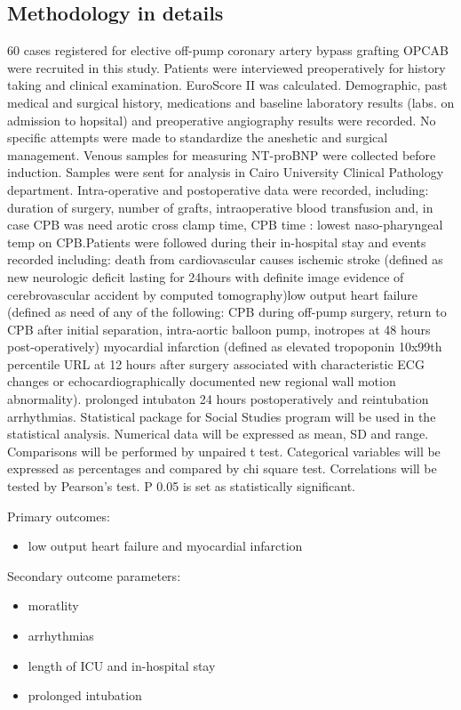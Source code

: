 \documentclass[14pt,a4paper,onecolumn]{article}
\begin{document}
\subsection{Methodology in details}

60 cases registered for elective off-pump coronary artery bypass grafting OPCAB were recruited in this study. Patients were interviewed preoperatively for history taking and clinical examination. EuroScore II was calculated. Demographic, past medical and surgical history, medications and baseline laboratory results (labs. on admission to hopsital) and preoperative angiography results were recorded.  No specific attempts were made to standardize the aneshetic and surgical management.  Venous samples for measuring NT-proBNP were collected before induction. Samples were sent for analysis in Cairo University Clinical Pathology department. Intra-operative and postoperative data were recorded, including: duration of surgery, number of grafts, intraoperative blood transfusion and, in case CPB was need arotic cross clamp time, CPB time : lowest naso-pharyngeal temp on CPB.Patients were followed during their in-hospital stay and events recorded including: death from cardiovascular causes ischemic stroke (defined as new neurologic deficit lasting for  24hours with definite image evidence of cerebrovascular accident by computed tomography)low output heart failure (defined as need of any of the following: CPB during off-pump surgery, return to CPB after initial separation, intra-aortic balloon pump, inotropes at 48 hours post-operatively) myocardial infarction (defined as elevated tropoponin 10x99th percentile URL at 12 hours after surgery associated with characteristic ECG changes or echocardiographically documented new regional wall motion abnormality). prolonged intubaton  24 hours postoperatively and reintubation arrhythmias.  Statistical package for Social Studies program will be used in the statistical analysis. Numerical data will be expressed as mean, SD and range. Comparisons will be performed by unpaired t test. Categorical variables will be expressed as percentages and compared by chi square test. Correlations will be tested by Pearson's test. P  0.05 is set as statistically significant.

Primary outcomes:
    \begin{itemize}
        \item low output heart failure and myocardial infarction
    \end{itemize}

Secondary outcome parameters:
    \begin{itemize}
        \item moratlity
        \item arrhythmias
        \item length of ICU and in-hospital stay
        \item prolonged intubation
    \end{itemize}
\end{document}
